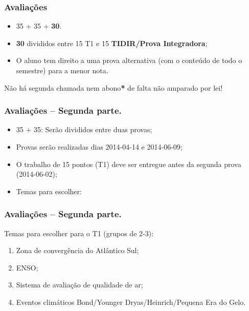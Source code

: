 \begin{frame}
    \frametitle{Avaliações}
    \begin{itemize}[<+-| alert@+>]
        \item 35 + 35 + {\bf 30}.
        \item {\bf 30} divididos entre 15 T1 e 15 {\bf TIDIR/Prova Integradora};
        \item O aluno tem direito a uma prova alternativa (com o conteúdo de
              todo o semestre) para a menor nota.
    \end{itemize}
    \pause
    \begin{block}{}
        Não há segunda chamada{\bf *} nem abono{\bf **}
        de falta não amparado por lei!
    \end{block}
    \pause
\end{frame}

\begin{frame}
    \frametitle{Avaliações -- Segunda parte.}
    \begin{itemize}[<+-| alert@+>]
        \item 35 + 35: Serão divididos entre duas provas;
        \item Provas serão realizadas dias 2014-04-14 e 2014-06-09;
        \item O trabalho de 15 pontos (T1) deve ser entregue antes da segunda
              prova (2014-06-02);
        \item Temas para escolher:
    \end{itemize}
\end{frame}

\begin{frame}
    \frametitle{Avaliações -- Segunda parte.}
        \begin{block}{}
        Temas para escolher para o T1 (grupos de 2-3):
        \end{block}
            \begin{enumerate}[<+-| alert@+>]
                \item Zona de convergência do Atlântico Sul;
                \item ENSO;
                \item Sistema de avaliação de qualidade de ar;
                \item Eventos climáticos Bond/Younger Dryas/Heinrich/Pequena Era
                      do Gelo.
            \end{enumerate}
\end{frame}


